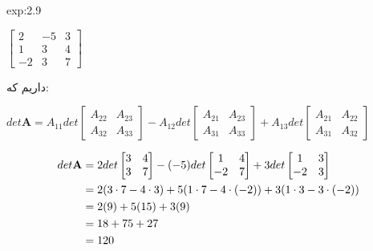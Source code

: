 {\begin{spacing}{1.5}
\begin{example}{exp:2.9}
            \begin{center}
                $\begin{bmatrix}
                     2  & -5 & 3 \\
                     1  & 3  & 4 \\
                     -2 & 3  & 7
                \end{bmatrix}$
            \end{center}

            داریم که:

            $det\textbf{A}=A_{11}det\begin{bmatrix}
                                        A_{22} & A_{23} \\
                                        A_{32} & A_{33}
            \end{bmatrix}-A_{12}det\begin{bmatrix}
                                       A_{21} & A_{23} \\
                                       A_{31} & A_{33}
            \end{bmatrix}+A_{13}det\begin{bmatrix}
                                       A_{21} & A_{22} \\
                                       A_{31} & A_{32}
            \end{bmatrix}$

            \begin{equation*}
                \centering
                \begin{split}
                    det\textbf{A}&=2det\begin{bmatrix}
                                           3 & 4 \\
                                           3 & 7
                    \end{bmatrix}-(-5)det\begin{bmatrix}
                                             1  & 4 \\
                                             -2 & 7
                    \end{bmatrix}+3det\begin{bmatrix}
                                          1  & 3 \\
                                          -2 & 3
                    \end{bmatrix}\\
                    &=2(3\cdot 7-4\cdot 3)+5(1\cdot 7-4\cdot(-2))+3(1\cdot 3-3\cdot(-2)) \\
                    &=2(9)+5(15)+3(9) \\
                    &=18+75+27 \\
                    &=120
                \end{split}
            \end{equation*}
        \end{example}
    \end{spacing}
}


